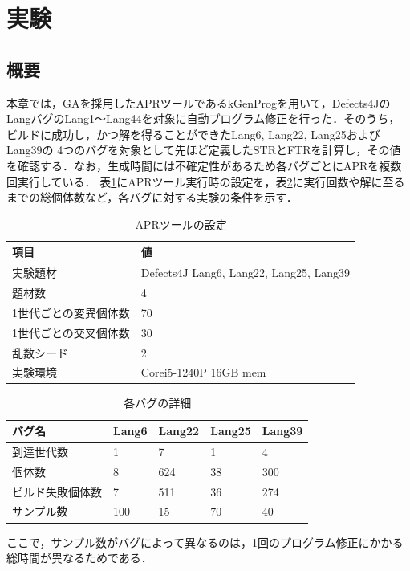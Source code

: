 \documentclass[uplatex,dvipdfmx,a4paper]{jsarticle}
\let\oldcite\cite
\renewcommand{\cite}[1]{\xspace\oldcite{#1}}
\begin{document}
\section{実験} \label{sec:exp}
\subsection{概要}
本章では，GAを採用したAPRツールであるkGenProg\cite{higo2018kgenprog}を用いて，Defects4J\cite{just2014defects4j}のLangバグのLang1～Lang44を対象に自動プログラム修正を行った．そのうち，ビルドに成功し，かつ解を得ることができたLang6, 
 Lang22, Lang25およびLang39の
4つのバグを対象として先ほど定義したSTRとFTRを計算し，その値を確認する．なお，生成時間には不確定性があるため各バグごとにAPRを複数回実行している．
表\ref{tab:apr_setting}にAPRツール実行時の設定を，表\ref{tab:project_setting}に実行回数や解に至るまでの総個体数など，各バグに対する実験の条件を示す．
\begin{table}[b]
  \centering
  \caption{APRツールの設定}
  \label{tab:apr_setting}
  \begin{tabular}{ll} \hline\hline
    項目         & 値                           \\\hline
    実験題材     & Defects4J Lang6, Lang22, Lang25, Lang39 \\
    題材数       & 4                           \\
    1世代ごとの変異個体数 & 70 \\
    1世代ごとの交叉個体数 & 30 \\
    乱数シード   & 2       \\
    実験環境     & Corei5-1240P 16GB mem  \\\hline\hline
  \end{tabular}
\end{table}
\begin{table}[b]
  \centering
  \caption{各バグの詳細}
  \label{tab:project_setting}
  \begin{tabular}{lllll} \hline\hline
    バグ名 & Lang6 & Lang22 & Lang25 & Lang39  \\\hline
    到達世代数 & 1 & 7 & 1 & 4 \\
    個体数 & 8 & 624 & 38 & 300 \\
    ビルド失敗個体数 & 7 & 511 & 36 & 274 \\
    サンプル数 & 100 & 15 & 70 & 40 \\\hline\hline
  \end{tabular}
\end{table}
ここで，サンプル数がバグによって異なるのは，1回のプログラム修正にかかる総時間が異なるためである．
\end{document}
